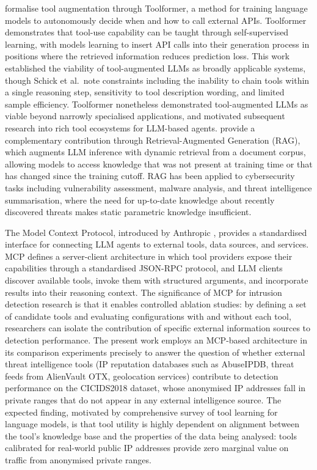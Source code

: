 \documentclass[../main.tex]{subfiles}
\begin{document}
\textcite{Schick2023} formalise tool augmentation through Toolformer, a method for training language models to autonomously decide when and how to call external APIs. Toolformer demonstrates that tool-use capability can be taught through self-supervised learning, with models learning to insert API calls into their generation process in positions where the retrieved information reduces prediction loss. This work established the viability of tool-augmented LLMs as broadly applicable systems, though Schick et al.\ note constraints including the inability to chain tools within a single reasoning step, sensitivity to tool description wording, and limited sample efficiency. Toolformer nonetheless demonstrated tool-augmented LLMs as viable beyond narrowly specialised applications, and motivated subsequent research into rich tool ecosystems for LLM-based agents. \textcite{Lewis2020} provide a complementary contribution through Retrieval-Augmented Generation (RAG), which augments LLM inference with dynamic retrieval from a document corpus, allowing models to access knowledge that was not present at training time or that has changed since the training cutoff. RAG has been applied to cybersecurity tasks including vulnerability assessment, malware analysis, and threat intelligence summarisation, where the need for up-to-date knowledge about recently discovered threats makes static parametric knowledge insufficient.

The Model Context Protocol, introduced by Anthropic \autocite{Anthropic2024}, provides a standardised interface for connecting LLM agents to external tools, data sources, and services. MCP defines a server-client architecture in which tool providers expose their capabilities through a standardised JSON-RPC protocol, and LLM clients discover available tools, invoke them with structured arguments, and incorporate results into their reasoning context. The significance of MCP for intrusion detection research is that it enables controlled ablation studies: by defining a set of candidate tools and evaluating configurations with and without each tool, researchers can isolate the contribution of specific external information sources to detection performance. The present work employs an MCP-based architecture in its comparison experiments precisely to answer the question of whether external threat intelligence tools (IP reputation databases such as AbuseIPDB, threat feeds from AlienVault OTX, geolocation services) contribute to detection performance on the CICIDS2018 dataset, whose anonymised IP addresses fall in private ranges that do not appear in any external intelligence source. The expected finding, motivated by \textcite{Qin2024} comprehensive survey of tool learning for language models, is that tool utility is highly dependent on alignment between the tool's knowledge base and the properties of the data being analysed: tools calibrated for real-world public IP addresses provide zero marginal value on traffic from anonymised private ranges.
\end{document}
